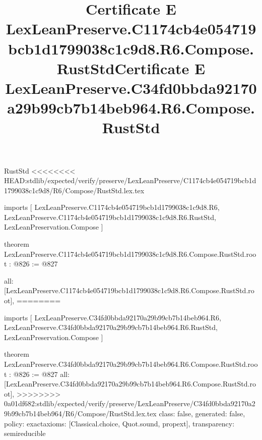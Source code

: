 \begin{lexlean}{RustStd}
<<<<<<<< HEAD:stdlib/expected/verify/preserve/LexLeanPreserve/C1174cb4e054719bcb1d1799038c1c9d8/R6/Compose/RustStd.lex.tex
\title{Certificate E LexLeanPreserve.C1174cb4e054719bcb1d1799038c1c9d8.R6.Compose.RustStd}
\begin{coremodule}
imports [
  LexLeanPreserve.C1174cb4e054719bcb1d1799038c1c9d8.R6,
  LexLeanPreserve.C1174cb4e054719bcb1d1799038c1c9d8.R6.RustStd,
  LexLeanPreservation.Compose
]

theorem LexLeanPreserve.C1174cb4e054719bcb1d1799038c1c9d8.R6.Compose.RustStd.root : @826 := @827 {
  all: [LexLeanPreserve.C1174cb4e054719bcb1d1799038c1c9d8.R6.Compose.RustStd.root],
========
\title{Certificate E LexLeanPreserve.C34fd0bbda92170a29b99cb7b14beb964.R6.Compose.RustStd}
\begin{coremodule}
imports [
  LexLeanPreserve.C34fd0bbda92170a29b99cb7b14beb964.R6,
  LexLeanPreserve.C34fd0bbda92170a29b99cb7b14beb964.R6.RustStd,
  LexLeanPreservation.Compose
]

theorem LexLeanPreserve.C34fd0bbda92170a29b99cb7b14beb964.R6.Compose.RustStd.root : @826 := @827 {
  all: [LexLeanPreserve.C34fd0bbda92170a29b99cb7b14beb964.R6.Compose.RustStd.root],
>>>>>>>> 0a01df682:stdlib/expected/verify/preserve/LexLeanPreserve/C34fd0bbda92170a29b99cb7b14beb964/R6/Compose/RustStd.lex.tex
  class: false,
  generated: false,
  policy: exact{axioms: [Classical.choice, Quot.sound, propext]},
  transparency: semireducible
}


\end{coremodule}}
\end{coremodule}
\end{lexlean}
